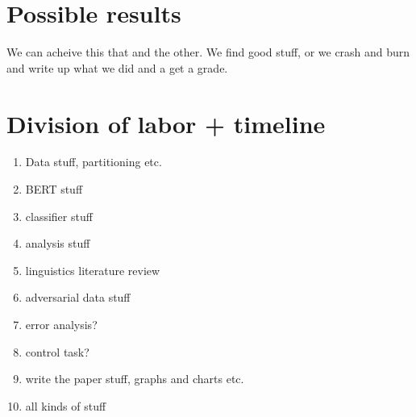 \documentclass[11pt]{article}
\begin{document}
\section{Possible results}
We can acheive this that and the other.  We find good stuff, or we crash and burn and write up what we did and a get a grade.

\section{Division of labor + timeline}

\begin{enumerate}
    \item Data stuff, partitioning etc.
    \item BERT stuff
    \item classifier stuff
    \item analysis stuff
    \item linguistics literature review
    \item adversarial data stuff
    \item error analysis?
    \item control task?
    \item write the paper stuff, graphs and charts etc.
    \item all kinds of stuff
    
\end{enumerate}



\end{document}
